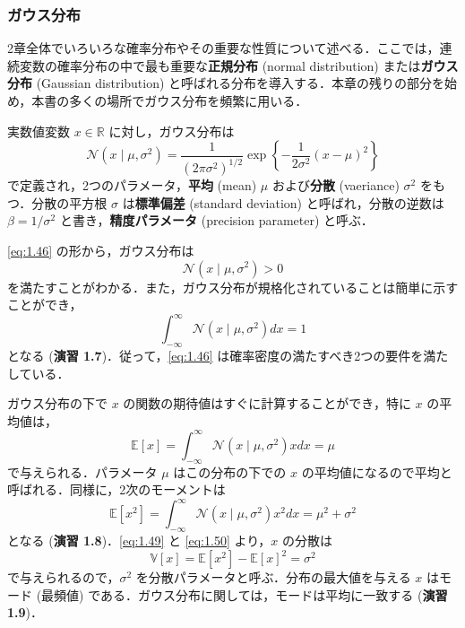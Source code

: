\documentclass[uplatex,a4paper,oneside,openany,dvipdfmx]{jsarticle}
\numberwithin{equation}{section}
\theoremstyle{mystyle} %
\newcommand{\BE}{\mathbb{E}}
\newcommand{\BR}{\mathbb{R}}
\newcommand{\BV}{\mathbb{V}}
\newcommand{\CN}{\mathcal{N}}
\newcommand{\tb}[1]{\textbf{#1}}
\begin{document}
\subsubsection{ガウス分布} \label{subsubsec:Gaussian-dist}

2章全体でいろいろな確率分布やその重要な性質について述べる．ここでは，連続変数の確率分布の中で最も重要な\tb{正規分布} (normal distribution) または\tb{ガウス分布} (Gaussian distribution) と呼ばれる分布を導入する．本章の残りの部分を始め，本書の多くの場所でガウス分布を頻繁に用いる．

実数値変数 $x \in \BR$ に対し，ガウス分布は
\begin{equation} \label{eq:1.46}
    \CN(x \mid \mu,\sigma^{2}) = \frac{1}{(2\pi\sigma^{2})^{1/2}} \exp{\left\{-\frac{1}{2\sigma^{2}}(x-\mu)^{2}\right\}}
\end{equation}
で定義され，2つのパラメータ，\tb{平均} (mean) $\mu$ および\tb{分散} (vaeriance) $\sigma^{2}$ をもつ．分散の平方根 $\sigma$ は\tb{標準偏差} (standard deviation) と呼ばれ，分散の逆数は $\beta = 1/\sigma^{2}$ と書き，\tb{精度パラメータ} (precision parameter) と呼ぶ．

\eqref{eq:1.46} の形から，ガウス分布は
\begin{equation} \label{eq:1.47}
    \CN(x \mid \mu,\sigma^{2}) > 0
\end{equation}
を満たすことがわかる．また，ガウス分布が規格化されていることは簡単に示すことができ，
\begin{equation} \label{eq:1.48}
    \int_{-\infty}^{\infty} \CN(x \mid \mu,\sigma^{2}) dx = 1
\end{equation}
となる (\tb{演習 1.7})．従って，\eqref{eq:1.46} は確率密度の満たすべき2つの要件を満たしている．

ガウス分布の下で $x$ の関数の期待値はすぐに計算することができ，特に $x$ の平均値は，
\begin{equation} \label{eq:1.49}
    \BE[x] = \int_{-\infty}^{\infty} \CN(x \mid \mu,\sigma^{2}) x dx = \mu
\end{equation}
で与えられる．パラメータ $\mu$ はこの分布の下での $x$ の平均値になるので平均と呼ばれる．同様に，2次のモーメントは
\begin{equation} \label{eq:1.50}
    \BE[x^{2}] = \int_{-\infty}^{\infty} \CN(x \mid \mu,\sigma^{2}) x^{2} dx = \mu^{2} + \sigma^{2}
\end{equation}
となる (\tb{演習 1.8})．\eqref{eq:1.49} と \eqref{eq:1.50} より，$x$ の分散は
\begin{equation} \label{eq:1.51}
    \BV[x] = \BE[x^{2}] - \BE[x]^{2} = \sigma^{2}
\end{equation}
で与えられるので，$\sigma^{2}$ を分散パラメータと呼ぶ．分布の最大値を与える $x$ はモード (最頻値) である．ガウス分布に関しては，モードは平均に一致する (\tb{演習 1.9})．
\end{document}
